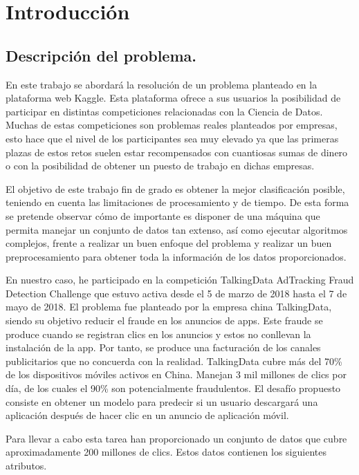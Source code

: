 \chapter[Introducción]{Introducción}
\section{Descripción del problema.}
En este trabajo se abordará la resolución de un problema planteado en la plataforma web Kaggle. Esta plataforma ofrece a sus usuarios la posibilidad de participar en distintas competiciones relacionadas con la Ciencia de Datos. Muchas de estas competiciones son problemas reales planteados por empresas, esto hace que el nivel de los participantes sea muy elevado ya que las primeras plazas de estos retos suelen estar recompensados con cuantiosas sumas de dinero o con la posibilidad de obtener un puesto de trabajo en dichas empresas.

El objetivo de este trabajo fin de grado es obtener la mejor clasificación posible, teniendo en cuenta las limitaciones de procesamiento y de tiempo. De esta forma se pretende observar cómo de importante es disponer de una máquina que permita manejar un conjunto de datos tan extenso, así como ejecutar algoritmos complejos, frente a realizar un buen enfoque del problema y realizar un buen preprocesamiento para obtener toda la información de los datos proporcionados.

En nuestro caso, he participado en la competición TalkingData AdTracking Fraud Detection Challenge que estuvo activa desde el 5 de marzo de 2018 hasta el 7 de mayo de 2018. El problema fue planteado por la empresa china TalkingData, siendo su objetivo reducir el fraude en los anuncios de apps. Este fraude se produce cuando se registran clics en los anuncios y estos no conllevan la instalación de la app. Por tanto, se produce una facturación de los canales publicitarios que no concuerda con la realidad.
TalkingData	cubre más del 70\% de los dispositivos móviles activos en China. Manejan 3 mil millones de clics por día, de los cuales el 90\% son potencialmente fraudulentos.  El desafío propuesto consiste en obtener un modelo para predecir si un usuario descargará una aplicación después de hacer clic en un anuncio de aplicación móvil.

Para llevar a cabo esta tarea han proporcionado un conjunto de datos que cubre aproximadamente 200 millones de clics. Estos datos contienen los siguientes atributos.


